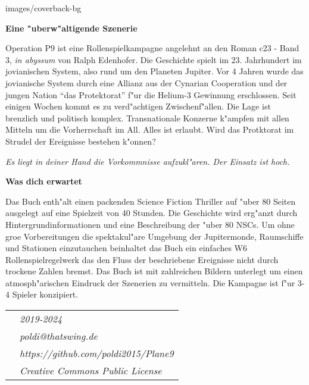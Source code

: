\begin{backcover}{images/coverback-bg}

    \vspace{5mm}
    \textbf{Eine "uberw"altigende Szenerie}

    Operation P9 ist eine Rollenspielkampagne angelehnt an den Roman c23 - Band 3, \textit{in abyssum} von Ralph Edenhofer. Die Geschichte spielt im 23. Jahrhundert im jovianischen System, also rund um den Planeten Jupiter. Vor 4 Jahren wurde das jovianische System durch eine Allianz aus der Cynarian Cooperation und der jungen Nation "`das Protektorat"' f"ur die Helium-3 Gewinnung erschlossen. Seit einigen Wochen kommt es zu verd"achtigen Zwischenf"allen. Die Lage ist brenzlich und politisch komplex. Transnationale Konzerne k"ampfen mit allen Mitteln um die Vorherrschaft im All. Alles ist erlaubt. Wird das Protktorat im Strudel der Ereignisse bestehen k"onnen?

    \medskip
    \emph{Es liegt in deiner Hand die Vorkommnisse aufzukl"aren. Der Einsatz ist hoch.}

    \vspace{5mm}
    \textbf{Was dich erwartet}

    Das Buch enth"alt einen packenden Science Fiction Thriller auf "uber 80 Seiten ausgelegt auf eine Spielzeit von 40 Stunden. Die Geschichte wird erg"anzt durch Hintergrundinformationen und eine Beschreibung der "uber 80 NSCs. Um ohne gro\3e Vorbereitungen die spektakul"are Umgebung der Jupitermonde, Raumschiffe und Stationen einzutauchen beinhaltet das Buch ein einfaches W6 Rollenspielregelwerk das den Fluss der beschriebene Ereignisse nicht durch trockene Zahlen bremst. Das Buch ist mit zahlreichen Bildern unterlegt um einen atmosph"arischen Eindruck der Szenerien zu vermitteln. Die Kampagne ist f"ur 3-4 Spieler konzipiert.

    \vspace{15mm}
    \newcommand{\footerentry}[1]{\textit{\normalsize{}{#1}}}
    \begin{tabularx}{\textwidth} {
        >{\raggedright\arraybackslash}X
        >{\raggedleft\arraybackslash}X
    }
        & \footerentry{2019-2024} \\
        & \footerentry{poldi@thatswing.de}\\
        & \footerentry{https://github.com/poldi2015/Plane9}\\
        & \footerentry{Creative Commons Public License} 
    \end{tabularx}

\end{backcover}
